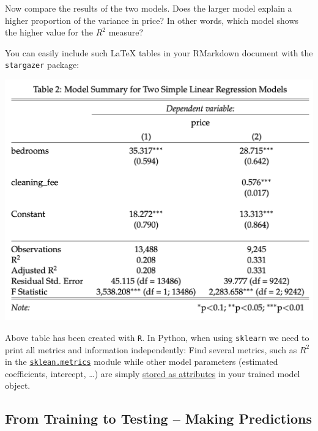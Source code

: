 \documentclass[
  11pt,
]{article}
\newenvironment{tips}[1]
  {
  \begin{itemize}
  \footnotesize
  \renewcommand{\labelitemi}{
    \raisebox{-.7\height}[0pt][0pt]{
      {\setkeys{Gin}{width=3em,keepaspectratio}
        \texttt{[image: images/\#1.png]}}
    }
  }
  \setlength{\fboxsep}{1em}
  \begin{rbox}
  \item
  }
  {
  \end{rbox}
  \end{itemize}
  }
\newenvironment{tipsp}[1]
  {
  \begin{itemize}
  \footnotesize
  \renewcommand{\labelitemi}{
    \raisebox{-.7\height}[0pt][0pt]{
      {\setkeys{Gin}{width=3em,keepaspectratio}
        \texttt{[image: images/\#1.png]}}
    }
  }
  \setlength{\fboxsep}{1em}
  \begin{pbox}
  \item
  }
  {
  \end{pbox}
  \end{itemize}
  }
\begin{document}
Now compare the results of the two models. Does the larger model explain a higher proportion of the variance in price? In other words, which model shows the higher value for the \(R^2\) measure?

\begin{tips}r

You can easily include such LaTeX tables in your RMarkdown document with the \texttt{stargazer} package:

\begin{center}\includegraphics[width=1\linewidth]{plot/5_table} \end{center}

\end{tips}

\begin{tipsp}p
Above table has been created with \texttt{R}. In Python, when using \texttt{sklearn} we need to print all metrics and information independently:
Find several metrics, such as \(R^2\) in the \href{https://scikit-learn.org/stable/modules/model_evaluation.html}{\texttt{sklean.metrics}} module while other model parameters (estimated coefficients, intercept, \ldots) are simply \href{https://scikit-learn.org/stable/modules/generated/sklearn.linear_model.LinearRegression.html}{stored as attributes} in your trained model object.

\end{tipsp}

\hypertarget{from-training-to-testing-making-predictions}{%
\subsection{From Training to Testing -- Making Predictions}\label{from-training-to-testing-making-predictions}}
\end{document}

